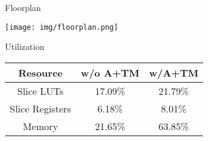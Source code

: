 \begin{block}{Floorplan}

\begin{minipage}{0.45\linewidth}
\texttt{[image: img/floorplan.png]}
\end{minipage}
\begin{minipage}{0.45\linewidth}
\centering
\alert{Utilization} \\[0.5\baselineskip]
\footnotesize
\begin{tabular}{ | c | c | c |  } \hline
    Resource        & w/o A+TM & w/A+TM  \\ \hline
    Slice LUTs      & 17.09\%   &  21.79\%   \\  \hline
    Slice Registers & 6.18\%    &  8.01\%    \\  \hline
    Memory          & 21.65\%   &  63.85\%   \\  \hline
\end{tabular}
\end{minipage}

\end{block}
